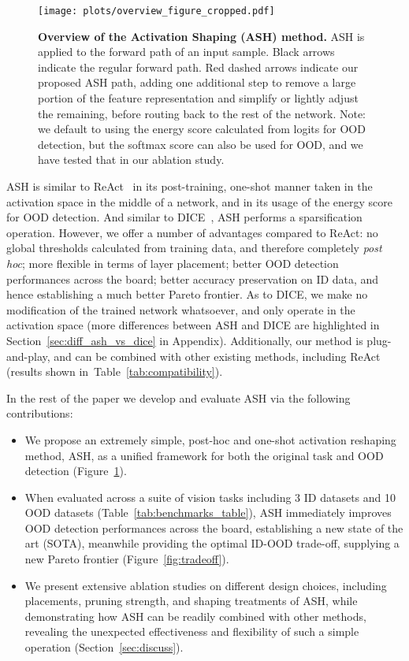 \documentclass{article}
\newcommand{\figlabel}[1]{\label{fig:#1}}
\newcommand{\figref}[1]{Figure~\ref{fig:#1}}
\newcommand{\secref}[1]{Section~\ref{sec:#1}}
\newcommand{\tabref}[1]{Table~\ref{tab:#1}}
\begin{document}
\begin{figure}[t]
    \centering 
	\texttt{[image: plots/overview\_figure\_cropped.pdf]}
	
	\caption{\textbf{Overview of the Activation Shaping (ASH) method.} ASH is applied to the forward path of an input sample. Black arrows indicate the regular forward path. Red dashed arrows indicate our proposed ASH path, adding one additional step to remove a large portion of the feature representation and simplify or lightly adjust the remaining, before routing back to the rest of the network. Note: we default to using the energy score calculated from logits for OOD detection, but the softmax score can also be used for OOD, and we have tested that in our ablation study.}
	\figlabel{overview}
\end{figure}

ASH is similar to ReAct~\citep{react} in its post-training, one-shot manner taken in the activation space in the middle of a network, and in its usage of the energy score for OOD detection. And similar to DICE~\citep{sun2022dice}, ASH performs a sparsification operation.
However, we offer a number of advantages compared to ReAct: no global thresholds calculated from training data, and therefore completely \emph{post hoc}; more flexible in terms of layer placement; better OOD detection performances across the board; better accuracy preservation on ID data, and hence establishing a much better Pareto frontier. As to DICE, we make no modification of the trained network whatsoever, and only operate in the activation space (more differences between ASH and DICE are highlighted in \secref{diff_ash_vs_dice} in Appendix). Additionally, our method is plug-and-play, and can be combined with other existing methods, including ReAct (results shown in~\tabref{compatibility}).

In the rest of the paper we develop and evaluate ASH via the following contributions:
\begin{itemize}
    \item We propose an extremely simple, post-hoc and one-shot activation reshaping method, ASH, as a unified framework for both the original task and OOD detection (\figref{overview}).
    
    \item When evaluated across a suite of vision tasks including 3 ID datasets and 10 OOD datasets (\tabref{benchmarks_table}), ASH immediately improves OOD detection performances across the board, establishing a new state of the art (SOTA), meanwhile providing the optimal ID-OOD trade-off, supplying a new Pareto frontier (\figref{tradeoff}).
    
    \item We present extensive ablation studies on different design choices, including placements, pruning strength, and shaping treatments of ASH, while demonstrating how ASH can be readily combined with other methods, revealing the unexpected effectiveness and flexibility of such a simple operation (\secref{discuss}).
    


\end{itemize}
\end{document}
